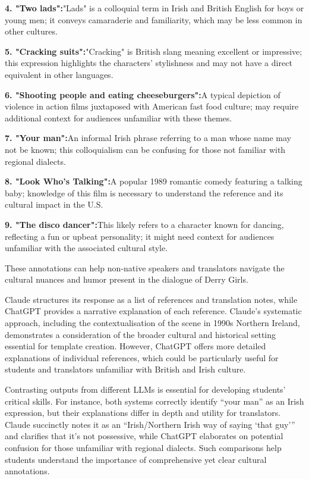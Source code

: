 \documentclass[output=paper]{langscibook}
\begin{document}
\textbf{{4. "Two lads":}}{"Lads" is a colloquial term in Irish and British English for boys or young men; it conveys camaraderie and familiarity, which may be less common in other cultures.}

\textbf{{5. "Cracking suits":}}{"Cracking" is British slang meaning excellent or impressive; this expression highlights the characters’ stylishness and may not have a direct equivalent in other languages.}

\textbf{{6. "Shooting people and eating cheeseburgers":}}{A typical depiction of violence in action films juxtaposed with American fast food culture; may require additional context for audiences unfamiliar with these themes.}

\textbf{{7. "Your man":}}{An informal Irish phrase referring to a man whose name may not be known; this colloquialism can be confusing for those not familiar with regional dialects.}

\textbf{{8. "Look Who's Talking":}}{A popular 1989 romantic comedy featuring a talking baby; knowledge of this film is necessary to understand the reference and its cultural impact in the U.S.}

\textbf{{9. "The disco dancer":}}{This likely refers to a character known for dancing, reflecting a fun or upbeat personality; it might need context for audiences unfamiliar with the associated cultural style.}

{These annotations can help non-native speakers and translators navigate the cultural nuances and humor present in the dialogue of Derry Girls.}
\z
\z

Claude structures its response as a list of references and translation notes, while ChatGPT provides a narrative explanation of each reference. Claude’s systematic approach, including the contextualisation of the scene in 1990s Northern Ireland, demonstrates a consideration of the broader cultural and historical setting essential for template creation. However, ChatGPT offers more detailed explanations of individual references, which could be particularly useful for students and translators unfamiliar with British and Irish culture.

Contrasting outputs from different LLMs is essential for developing students’ critical skills. For instance, both systems correctly identify “your man” as an Irish expression, but their explanations differ in depth and utility for translators. Claude succinctly notes it as an “Irish/Northern Irish way of saying ‘that guy’” and clarifies that it’s not possessive, while ChatGPT elaborates on potential confusion for those unfamiliar with regional dialects. Such comparisons help students understand the importance of comprehensive yet clear cultural annotations.
\end{document}

